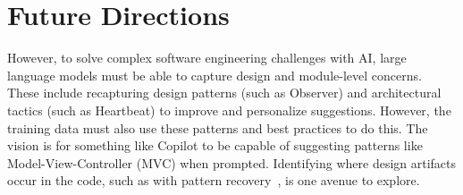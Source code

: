 \section{Future Directions}
\label{future}


However, to solve complex software engineering challenges with AI, large language models must be able to capture design and module-level concerns. 
These include recapturing design patterns (such as Observer) and architectural tactics (such as Heartbeat) to improve and personalize suggestions. 
However, the training data must also use these patterns and best practices to do this.
The vision is for something like Copilot to be capable of suggesting patterns like Model-View-Controller (MVC) when prompted. 
Identifying where design artifacts occur in the code, such as with pattern recovery~\cite{Keim2020}, is one avenue to explore. 